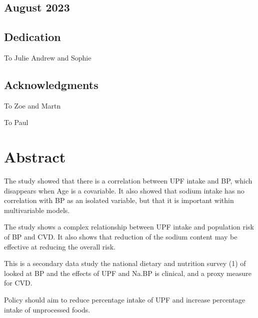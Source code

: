 \documentclass[
]{article}
\begin{document}
\hypertarget{august-2023}{%
\subsection*{August 2023}\label{august-2023}}

\newpage

\hypertarget{dedication}{%
\subsection*{Dedication}\label{dedication}}

To Julie Andrew and Sophie

\newpage

\hypertarget{acknowledgments}{%
\subsection*{Acknowledgments}\label{acknowledgments}}

To Zoe and Martn

To Paul

\newpage

\newpage

\hypertarget{abstract}{%
\section*{Abstract}\label{abstract}}

The study showed that there is a correlation between UPF intake and BP,
which disappears when Age is a covariable. It also showed that sodium
intake has no correlation with BP as an isolated variable, but that it
is important within multivariable models.

The study shows a complex relationship between UPF intake and population
risk of BP and CVD. It also shows that reduction of the sodium content
may be effective at reducing the overall risk.

This is a secondary data study the national dietary and nutrition survey
(1) of looked at BP and the effects of UPF and Na.BP is clinical, and a
proxy measure for CVD.

Policy should aim to reduce percentage intake of UPF and increase
percentage intake of unprocessed foods.

\tableofcontents
\listoffigures
\listoftables
\newpage
\end{document}
